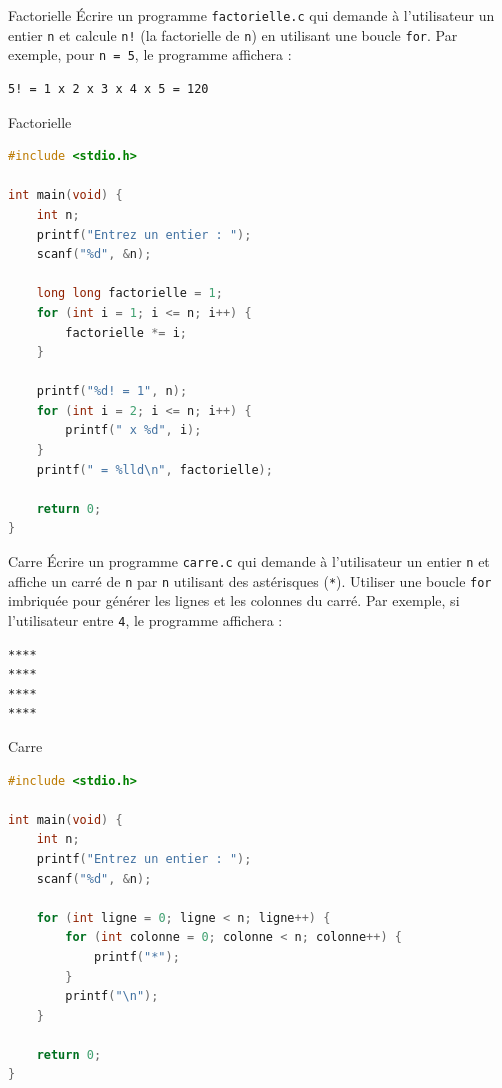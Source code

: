 \begin{UPSTIexercice}{Factorielle}
	\UPSTIetape Écrire un programme \texttt{factorielle.c} qui demande à l’utilisateur un entier \texttt{n} et calcule \texttt{n!} (la factorielle de \texttt{n}) en utilisant une boucle \texttt{for}.
	Par exemple, pour \texttt{n = 5}, le programme affichera :
	\begin{lstlisting}[language=bash,style=console]
5! = 1 x 2 x 3 x 4 x 5 = 120
\end{lstlisting}
\end{UPSTIexercice}

\begin{UPSTIcorrectionP}{Factorielle}
	\begin{lstlisting}[language=c]
#include <stdio.h>

int main(void) {
    int n;
    printf("Entrez un entier : ");
    scanf("%d", &n);

    long long factorielle = 1;
    for (int i = 1; i <= n; i++) {
        factorielle *= i;
    }

    printf("%d! = 1", n);
    for (int i = 2; i <= n; i++) {
        printf(" x %d", i);
    }
    printf(" = %lld\n", factorielle);

    return 0;
}
	\end{lstlisting}
\end{UPSTIcorrectionP}

\begin{UPSTIexercice}{Carre}
	\UPSTIetape Écrire un programme \texttt{carre.c} qui demande à l'utilisateur un entier \texttt{n} et affiche un carré de \texttt{n} par \texttt{n} utilisant des astérisques (\texttt{*}). Utiliser une boucle \texttt{for} imbriquée pour générer les lignes et les colonnes du carré.
	Par exemple, si l'utilisateur entre \texttt{4}, le programme affichera :
	\begin{lstlisting}[language=bash,style=console]
****
****
****
****
\end{lstlisting}
\end{UPSTIexercice}

\begin{UPSTIcorrectionP}{Carre}
	\begin{lstlisting}[language=c]
#include <stdio.h>

int main(void) {
    int n;
    printf("Entrez un entier : ");
    scanf("%d", &n);

    for (int ligne = 0; ligne < n; ligne++) {
        for (int colonne = 0; colonne < n; colonne++) {
            printf("*");
        }
        printf("\n");
    }

    return 0;
}
	\end{lstlisting}
\end{UPSTIcorrectionP}

